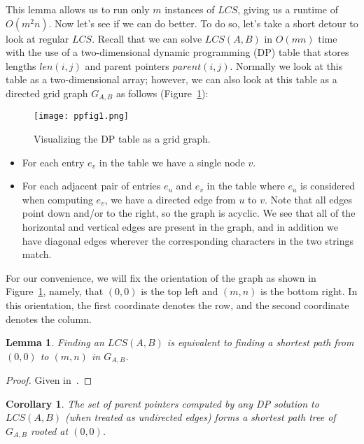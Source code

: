 \documentclass{article}
\newtheorem{lemma}{Lemma}
\newtheorem{corollary}{Corollary}
\begin{document}
This lemma allows us to run only $m$ instances of $LCS$, giving us a runtime of $O(m^2 n)$.  Now let's see if we can do better.  To do so, let's take a short detour to look at regular $LCS$.  Recall that we can solve $LCS(A,B)$ in $O(mn)$ time with the use of a two-dimensional dynamic programming (DP) table that stores lengths $len(i,j)$ and parent pointers $parent(i,j)$.  Normally we look at this table as a two-dimensional array; however, we can also look at this table as a directed grid graph $G_{A,B}$ as follows (Figure~\ref{fig:tabletograph}):

\begin{figure}[htb]
\centering
\texttt{[image: ppfig1.png]}
\caption{Visualizing the DP table as a grid graph.}
\label{fig:tabletograph}
\end{figure}

\begin{itemize}
\item For each entry $e_v$ in the table we have a single node $v$.
\item For each adjacent pair of entries $e_u$ and $e_v$ in the table where $e_u$ is considered when computing $e_v$, we have a directed edge from $u$ to $v$.  Note that all edges point down and/or to the right, so the graph is acyclic.  We see that all of the horizontal and vertical edges are present in the graph, and in addition we have diagonal edges wherever the corresponding characters in the two strings match.
\end{itemize}

For our convenience, we will fix the orientation of the graph as shown in Figure~\ref{fig:tabletograph}, namely, that $(0,0)$ is the top left and $(m, n)$ is the bottom right.  In this orientation, the first coordinate denotes the row, and the second coordinate denotes the column.

\begin{lemma}
Finding an $LCS(A,B)$ is equivalent to finding a shortest path from $(0,0)$ to $(m, n)$ in $G_{A,B}$.
\end{lemma}
\begin{proof}
Given in~\cite{M90}.
\end{proof}

\begin{corollary}
The set of parent pointers computed by any DP solution to $LCS(A,B)$ (when treated as undirected edges) forms a shortest path tree of $G_{A,B}$ rooted at $(0,0)$.
\end{corollary}
\end{document}
